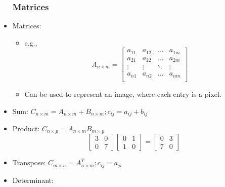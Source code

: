 \begin{itemize}
\subsubsection{Matrices}
	\item Matrices:
	\begin{itemize}
		\item e.g.,
		$$A_{n\times m}=\begin{bmatrix}
			a_{11} & a_{12} &\ldots & a_{1m}\\
			a_{21} & a_{22} &\ldots & a_{2m}\\
			\vdots &\vdots &\ddots & \vdots\\
			a_{n1} & a_{n2} &\ldots &a_{nm}\\
		\end{bmatrix}$$
		\item Can be used to represent an image, where each entry is a pixel.		
	\end{itemize}
	\item Sum: $C_{n\times m}=A_{n\times m}+B_{n\times m}; c_{ij}=a_{ij}+b_{ij}$
	\item Product: $C_{n\times p}=A_{n\times m}B_{m\times p}$
	$$\begin{bmatrix}
		3 & 0 \\
		0 & 7 
	\end{bmatrix}\begin{bmatrix}
		0 & 1 \\
		1 & 0
	\end{bmatrix}=\begin{bmatrix}
		0 & 3 \\
		7 & 0
	\end{bmatrix}$$
	\item Transpose: $C_{m\times n}=A^{T}_{n\times m}; c_{ij}=a_{ji}$
	\item Determinant: 
\end{itemize}
